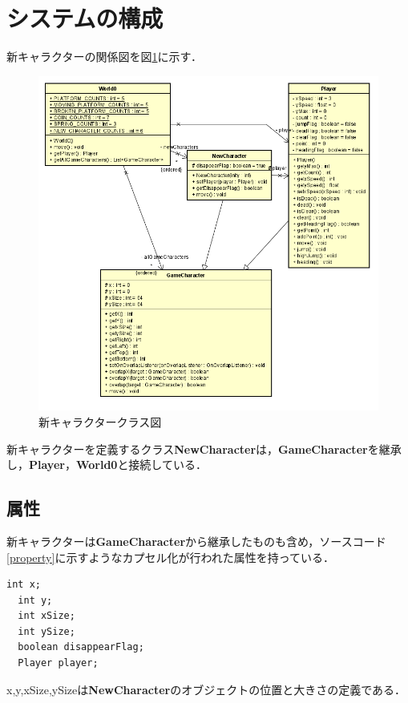 \documentclass[titlepage,dvipdfmx]{jarticle}
\newcommand{\className}{\textbf}%
\begin{document}
\section{システムの構成}
新キャラクターの関係図を図\ref{class}に示す．
\begin{figure}[H]
  \centering
  \includegraphics[width=12cm]{img/class.png}
  \caption{新キャラクタークラス図}
  \label{class}
\end{figure}

新キャラクターを定義するクラス\className{NewCharacter}は，\className{GameCharacter}を継承し，\className{Player}，\className{World0}と接続している．
\subsection*{属性}
新キャラクターは\className{GameCharacter}から継承したものも含め，ソースコード\ref{property}に示すようなカプセル化が行われた属性を持っている．
\begin{lstlisting}[caption=属性,label=property]
  int x;
  int y;
  int xSize;
  int ySize;
  boolean disappearFlag;
  Player player;
\end{lstlisting}

x,y,xSize,ySizeは\className{NewCharacter}のオブジェクトの位置と大きさの定義である．
\end{document}
